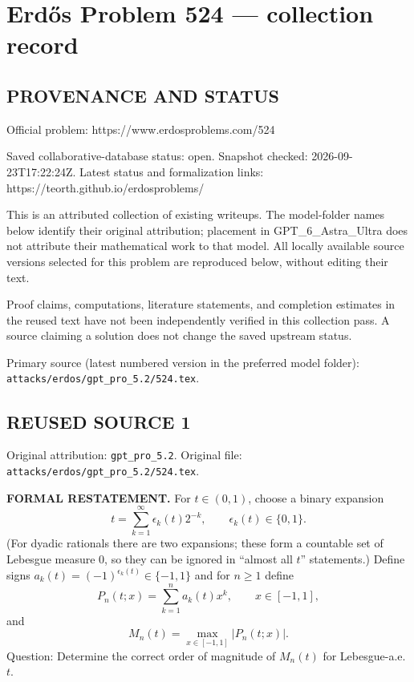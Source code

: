 \section*{Erd\H{o}s Problem 524 --- collection record}

\subsection*{PROVENANCE AND STATUS}
Official problem: https://www.erdosproblems.com/524

Saved collaborative-database status: open.
Snapshot checked: 2026-09-23T17:22:24Z.
Latest status and formalization links: https://teorth.github.io/erdosproblems/

This is an attributed collection of existing writeups. The model-folder names below identify their original attribution; placement in GPT\_6\_Astra\_Ultra does not attribute their mathematical work to that model. All locally available source versions selected for this problem are reproduced below, without editing their text.

Proof claims, computations, literature statements, and completion estimates in the reused text have not been independently verified in this collection pass. A source claiming a solution does not change the saved upstream status.

Primary source (latest numbered version in the preferred model folder): \texttt{attacks/erdos/gpt\_pro\_5.2/524.tex}.

\subsection*{REUSED SOURCE 1}
Original attribution: \texttt{gpt\_pro\_5.2}.
Original file: \texttt{attacks/erdos/gpt\_pro\_5.2/524.tex}.


\noindent\textbf{FORMAL RESTATEMENT.}
For $t\in(0,1)$, choose a binary expansion
\[t=\sum_{k=1}^\infty \epsilon_k(t)2^{-k},\qquad \epsilon_k(t)\in\{0,1\}.
\]
(For dyadic rationals there are two expansions; these form a countable set of Lebesgue measure $0$, so they can be ignored in ``almost all $t$'' statements.)
Define signs $a_k(t)=(-1)^{\epsilon_k(t)}\in\{-1,1\}$ and for $n\ge 1$ define
\[P_n(t;x)=\sum_{k=1}^n a_k(t) x^k,\qquad x\in[-1,1],
\]
and
\[M_n(t)=\max_{x\in[-1,1]} |P_n(t;x)|.
\]
Question: Determine the correct order of magnitude of $M_n(t)$ for Lebesgue-a.e. $t$.


